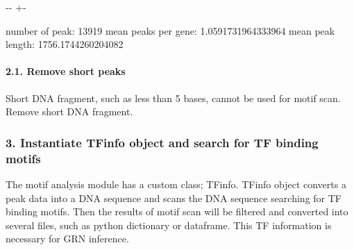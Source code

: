 \documentclass[letterpaper,10pt,english]{sphinxmanual}
\newlength\nbsphinxcodecellspacing
\begin{document}
%
{
\kern-\sphinxverbatimsmallskipamount\kern-\baselineskip
\kern+\FrameHeightAdjust\kern-\fboxrule
\vspace{\nbsphinxcodecellspacing}
%
\begin{sphinxVerbatim}[commandchars=\\\{\}]
number of peak: 13919
mean peaks per gene: 1.0591731964333964
mean peak length: 1756.1744260204082
\end{sphinxVerbatim}
}
\relax


\paragraph{2.1. Remove short peaks}
\label{\detokenize{notebooks/02_motif_scan/02_atac_peaks_to_TFinfo_with_celloracle_190901:2.1.-Remove-short-peaks}}
Short DNA fragment, such as less than 5 bases, cannot be used for motif scan. Remove short DNA fragment.

{
%
\begin{sphinxVerbatim}[commandchars=\\\{\}]
\llap{\color{nbsphinxin}[6]:\,\hspace{\fboxrule}\hspace{\fboxsep}}  \PYG{p}{[}\PYG{p}{]}
\end{sphinxVerbatim}
}


\subsubsection{3. Instantiate TFinfo object and search for TF binding motifs}
\label{\detokenize{notebooks/02_motif_scan/02_atac_peaks_to_TFinfo_with_celloracle_190901:3.-Instantiate-TFinfo-object-and-search-for-TF-binding-motifs}}
The motif analysis module has a custom class; TFinfo. TFinfo object converts a peak data into a DNA sequence and scans the DNA sequence searching for TF binding motifs. Then the results of motif scan will be filtered and converted into several files, such as python dictionary or dataframe. This TF information is necessary for GRN inference.
\end{document}
